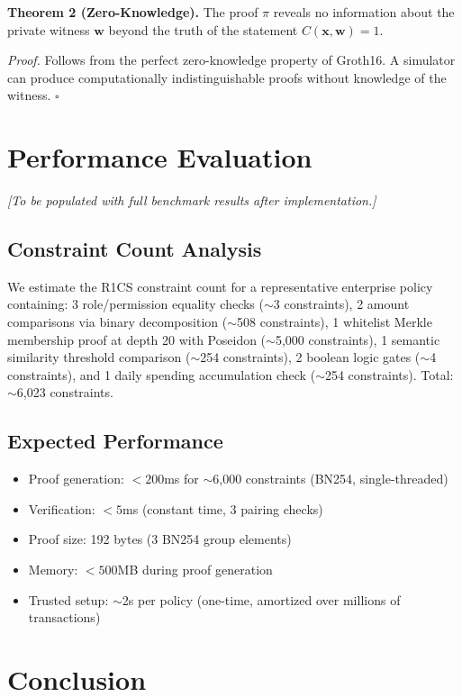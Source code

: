\documentclass[conference]{IEEEtran}
\begin{document}
\textbf{Theorem 2 (Zero-Knowledge).} The proof $\pi$ reveals no information about the private witness $\mathbf{w}$ beyond the truth of the statement $C(\mathbf{x}, \mathbf{w}) = 1$.

\textit{Proof.} Follows from the perfect zero-knowledge property of Groth16. A simulator can produce computationally indistinguishable proofs without knowledge of the witness. \hfill $\square$

\section{Performance Evaluation}

\textit{[To be populated with full benchmark results after implementation.]}

\subsection{Constraint Count Analysis}

We estimate the R1CS constraint count for a representative enterprise policy containing: 3 role/permission equality checks ($\sim$3 constraints), 2 amount comparisons via binary decomposition ($\sim$508 constraints), 1 whitelist Merkle membership proof at depth 20 with Poseidon ($\sim$5,000 constraints), 1 semantic similarity threshold comparison ($\sim$254 constraints), 2 boolean logic gates ($\sim$4 constraints), and 1 daily spending accumulation check ($\sim$254 constraints). Total: $\sim$6,023 constraints.

\subsection{Expected Performance}
\begin{itemize}
    \item Proof generation: $< 200$ms for $\sim$6,000 constraints (BN254, single-threaded)
    \item Verification: $< 5$ms (constant time, 3 pairing checks)
    \item Proof size: 192 bytes (3 BN254 group elements)
    \item Memory: $< 500$MB during proof generation
    \item Trusted setup: $\sim$2s per policy (one-time, amortized over millions of transactions)
\end{itemize}

\section{Conclusion}
\end{document}
